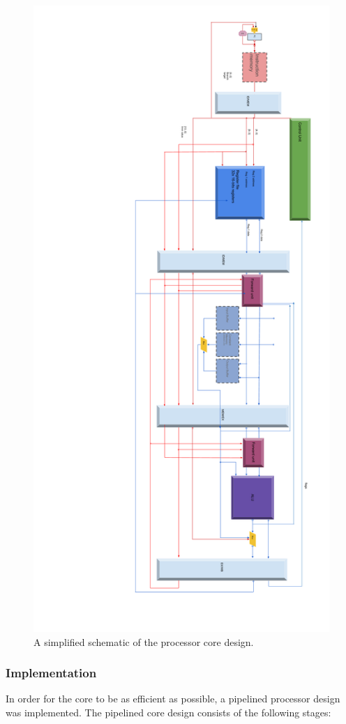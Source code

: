 \begin{figure}
	\centering
	\includegraphics[width=0.8\linewidth]{figures/fpga/core_schematic}
	\caption{A simplified schematic of the processor core design.}
	\label{fig:core_schematic}
\end{figure}

\subsubsection{Implementation}

In order for the core to be as efficient as possible, a pipelined processor
design was implemented. The pipelined core design consists of the following
stages:

